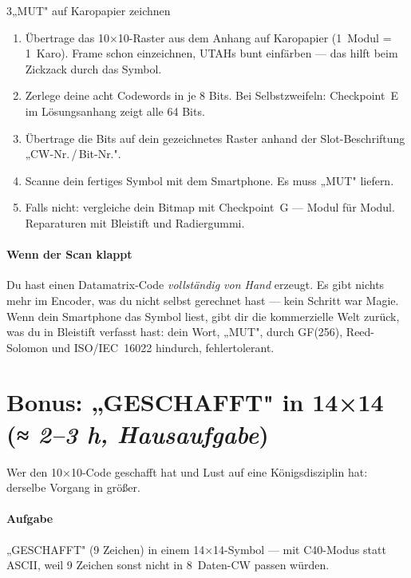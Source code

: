 \begin{bleistiftuebung}{3}{„MUT" auf Karopapier zeichnen}
\begin{enumerate}[label=\alph*)]
\item Übertrage das 10×10-Raster aus dem Anhang auf Karopapier
  (1~Modul = 1~Karo). Frame schon einzeichnen, UTAHs bunt
  einfärben — das hilft beim Zickzack durch das Symbol.
\item Zerlege deine acht Codewords in je 8 Bits. Bei Selbstzweifeln:
  Checkpoint~E im Lösungsanhang zeigt alle 64 Bits.
\item Übertrage die Bits auf dein gezeichnetes Raster anhand der
  Slot-Beschriftung „CW-Nr.\,/\,Bit-Nr.".
\item Scanne dein fertiges Symbol mit dem Smartphone. Es muss „MUT"
  liefern.
\item Falls nicht: vergleiche dein Bitmap mit Checkpoint~G — Modul
  für Modul. Reparaturen mit Bleistift und Radiergummi.
\end{enumerate}
\end{bleistiftuebung}

\paragraph{Wenn der Scan klappt} Du hast einen Datamatrix-Code
\textit{vollständig von Hand} erzeugt. Es gibt nichts mehr im
Encoder, was du nicht selbst gerechnet hast — kein Schritt war Magie.
Wenn dein Smartphone das Symbol liest, gibt dir die kommerzielle
Welt zurück, was du in Bleistift verfasst hast: dein Wort, „MUT",
durch GF(256), Reed-Solomon und ISO/IEC~16022 hindurch, fehlertolerant.

\section{Bonus: „GESCHAFFT" in 14×14
         \normalfont(\textit{≈ 2--3 h, Hausaufgabe})}

Wer den 10×10-Code geschafft hat und Lust auf eine Königsdisziplin
hat: derselbe Vorgang in größer.

\paragraph{Aufgabe} „GESCHAFFT" (9 Zeichen) in einem 14×14-Symbol —
mit C40-Modus statt ASCII, weil 9 Zeichen sonst nicht in 8~Daten-CW
passen würden.

